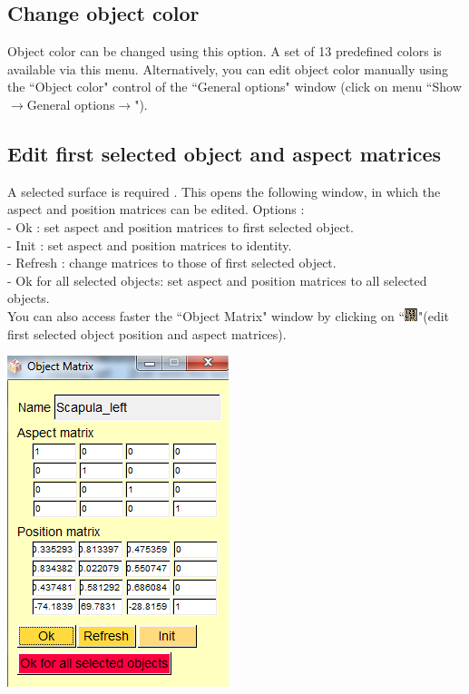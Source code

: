 \subsection{Change object color}
Object color can be changed using this option. A set of 13 predefined colors is available via this menu. Alternatively, you can edit object color manually using the ``Object color" control of the ``General options" window (click on menu ``Show $\rightarrow$General options$\rightarrow$").

\subsection{Edit first selected object and aspect matrices}\label{edit_mat_section}

\noindent
\begin{minipage}{0.6\textwidth}

A selected surface is required . This opens the following window,
in which the aspect and position matrices can be edited.
Options :\\
- Ok : set aspect and position matrices to first selected object.\\
- Init : set aspect and position matrices to identity.\\
- Refresh : change matrices to those of first selected object.\\
- Ok for all selected objects: set aspect and position matrices to
all selected objects.\\
You can also access faster the ``Object Matrix" window by clicking
on ``\includegraphics[scale=0.7]{images/pixmap/mat.png}"(edit first selected object position and aspect matrices).

\end{minipage}    
\begin{minipage}{0.4\textwidth}\centering
  \includegraphics[scale=0.5]{images/File/Position2.png}
 \end{minipage} 
\noindent



